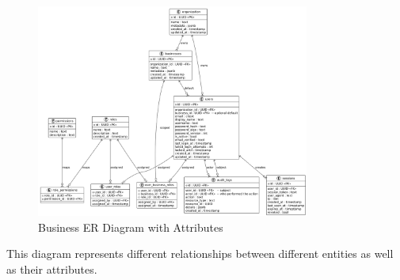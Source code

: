 \documentclass[]{VUMIFTemplateClass}
\begin{document}
\begin{figure}[H]
    \centering
    \includegraphics[width=0.8\textwidth]{images/diagrams/business/data_model_business.png}
    \caption{Business ER Diagram with Attributes}
    \label{fig:business_er_diagram}
\end{figure}
This diagram represents different relationships between different entities as well as their attributes. 

\printbibliography[title = {References and sources}]
\end{document}
